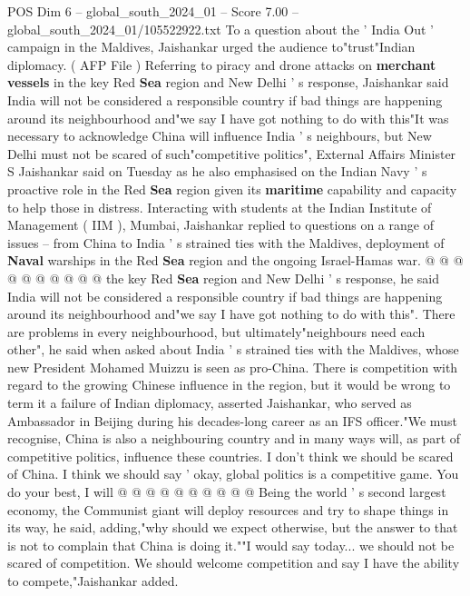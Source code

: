 \begin{textsample}{POS Dim 6 – global\_south\_2024\_01 – Score 7.00 – global\_south\_2024\_01/105522922.txt}  \label{ex:f6_pos_095}
To a question about the ' India Out ' campaign in the Maldives, Jaishankar urged the audience to"trust"Indian diplomacy. ( AFP File ) Referring to piracy and drone attacks on \textbf{merchant} \textbf{vessels} in the key Red \textbf{Sea} region and New Delhi ' s response, Jaishankar said India will not be considered a responsible country if bad things are happening around its neighbourhood and"we say I have got nothing to do with this"It was necessary to acknowledge China will influence India ' s neighbours, but New Delhi must not be scared of such"competitive politics", External Affairs Minister S Jaishankar said on Tuesday as he also emphasised on the Indian Navy ' s proactive role in the Red \textbf{Sea} region given its \textbf{maritime} capability and capacity to help those in distress.
Interacting with students at the Indian Institute of Management ( IIM ), Mumbai, Jaishankar replied to questions on a range of issues -- from China to India ' s strained ties with the Maldives, deployment of \textbf{Naval} warships in the Red \textbf{Sea} region and the ongoing Israel-Hamas war. @ @ @ @ @ @ @ @ @ @ the key Red \textbf{Sea} region and New Delhi ' s response, he said India will not be considered a responsible country if bad things are happening around its neighbourhood and"we say I have got nothing to do with this".
There are problems in every neighbourhood, but ultimately"neighbours need each other", he said when asked about India ' s strained ties with the Maldives, whose new President Mohamed Muizzu is seen as pro-China.
There is competition with regard to the growing Chinese influence in the region, but it would be wrong to term it a failure of Indian diplomacy, asserted Jaishankar, who served as Ambassador in Beijing during his decades-long career as an IFS officer."We must recognise, China is also a neighbouring country and in many ways will, as part of competitive politics, influence these countries.
I don't think we should be scared of China.
I think we should say ' okay, global politics is a competitive game.
You do your best, I will @ @ @ @ @ @ @ @ @ @ Being the world ' s second largest economy, the Communist giant will deploy resources and try to shape things in its way, he said, adding,"why should we expect otherwise, but the answer to that is not to complain that China is doing it.""I would say today... we should not be scared of competition.
We should welcome competition and say I have the ability to compete,"Jaishankar added.

\end{textsample}
